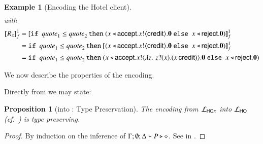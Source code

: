 \documentclass[preprint,11pt]{elsarticle}
\newtheorem{proposition}{Proposition}[section]
\newtheorem{example}{Example}[section]
\newcommand{\Quotev}{\mathit{quote}}
\newcommand{\accept}{\mathsf{accept}}
\newcommand{\reject}{\mathsf{reject}}
\newcommand{\creditc}{\mathsf{credit}}
\begin{document}
{{\begin{example}[Encoding the Hotel client]
\begin{align*}
\end{align*}
with 
\begin{align*}
\pmapp{R_x}{1}{f} & =  \pmapp{\If\ \Quotev_1 \leq \Quotev_2 \, \Then  (\bsel{x}{\accept} \bout{x}{\creditc} \inact \  \Else \ \bsel{x}{\reject} \inact)}{1}{f}
\\
 & =  \If\ \Quotev_1 \leq \Quotev_2 \, \Then  \pmapp{(\bsel{x}{\accept} \bout{x}{\creditc} \inact \  \Else \ \bsel{x}{\reject} \inact)}{1}{f}
\\
 & =  \If\ \Quotev_1 \leq \Quotev_2 \, \Then  (\bsel{x}{\accept} \bout{x}{ \abs{z}{\,\binp{z}{x} (\appl{x}{\creditc})} }  \inact \  \Else \ \bsel{x}{\reject} \inact)
\end{align*}
\end{example}

We now describe the properties of the encoding. 
{Directly from  we may state:

\begin{proposition}[\HOp into \HO: Type Preservation]
\label{prop:typepres_HOp_to_HO}
The encoding from $\mathcal{L}_{\mathsf{HO}\pi}$ into $\mathcal{L}_{\mathsf{HO}}$ (cf.~)
is type preserving.
\end{proposition}}

\begin{proof}
By induction on the inference of $\Gamma; \emptyset; \Delta \vdash P \triangleright \diamond$.
See  in .
\end{proof}

}}
\end{document}
